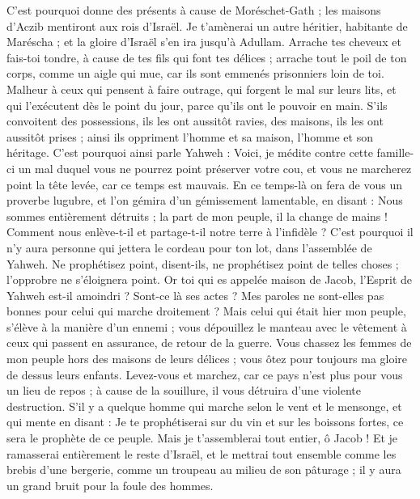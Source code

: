\begin{multicols}{2}
C'est pourquoi donne des présents à cause de Moréschet-Gath ; les maisons d'Aczib mentiront aux rois d'Israël.
Je t'amènerai un autre héritier, habitante de Maréscha ; et la gloire d'Israël s'en ira jusqu'à Adullam.
Arrache tes cheveux et fais-toi tondre, à cause de tes fils qui font tes délices ; arrache tout le poil de ton corps, comme un aigle qui mue, car ils sont emmenés prisonniers loin de toi.
\VerseOne{}Malheur à ceux qui pensent à faire outrage, qui forgent le mal sur leurs lits, et qui l'exécutent dès le point du jour, parce qu'ils ont le pouvoir en main.
S'ils convoitent des possessions, ils les ont aussitôt ravies, des maisons, ils les ont aussitôt prises ; ainsi ils oppriment l'homme et sa maison, l'homme et son héritage.
C'est pourquoi ainsi parle Yahweh : Voici, je médite contre cette famille-ci un mal duquel vous ne pourrez point préserver votre cou, et vous ne marcherez point la tête levée, car ce temps est mauvais.
En ce temps-là on fera de vous un proverbe lugubre, et l'on gémira d'un gémissement lamentable, en disant : Nous sommes entièrement détruits ; la part de mon peuple, il la change de mains ! Comment nous enlève-t-il et partage-t-il notre terre à l'infidèle ?
C'est pourquoi il n'y aura personne qui jettera le cordeau pour ton lot, dans l'assemblée de Yahweh.
Ne prophétisez point, disent-ils, ne prophétisez point de telles choses ; l'opprobre ne s'éloignera point.
Or toi qui es appelée maison de Jacob, l'Esprit de Yahweh est-il amoindri ? Sont-ce là ses actes ? Mes paroles ne sont-elles pas bonnes pour celui qui marche droitement ?
Mais celui qui était hier mon peuple, s'élève à la manière d'un ennemi ; vous dépouillez le manteau avec le vêtement à ceux qui passent en assurance, de retour de la guerre.
Vous chassez les femmes de mon peuple hors des maisons de leurs délices ; vous ôtez pour toujours ma gloire de dessus leurs enfants.
Levez-vous et marchez, car ce pays n'est plus pour vous un lieu de repos ; à cause de la souillure, il vous détruira d'une violente destruction.
S'il y a quelque homme qui marche selon le vent et le mensonge, et qui mente en disant : Je te prophétiserai sur du vin et sur les boissons fortes, ce sera le prophète de ce peuple.
Mais je t'assemblerai tout entier, ô Jacob ! Et je ramasserai entièrement le reste d'Israël, et le mettrai tout ensemble comme les brebis d'une bergerie, comme un troupeau au milieu de son pâturage ; il y aura un grand bruit pour la foule des hommes.

\end{multicols}
